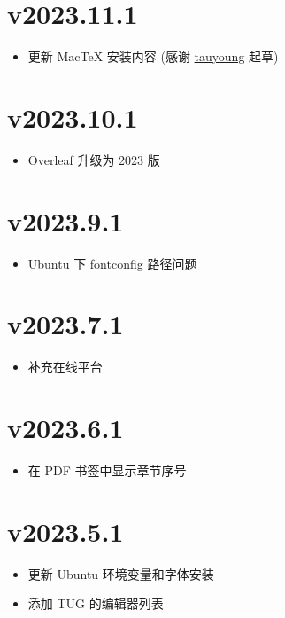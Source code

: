 \section*{v2023.11.1}

\begin{itemize}
  \item 更新 MacTeX 安装内容 (感谢 \href{https://github.com/tauyoungsama}{tauyoung} 起草)
\end{itemize}

\section*{v2023.10.1}

\begin{itemize}
  \item Overleaf 升级为 2023 版
\end{itemize}

\section*{v2023.9.1}

\begin{itemize}
  \item Ubuntu 下 fontconfig 路径问题
\end{itemize}

\section*{v2023.7.1}

\begin{itemize}
  \item 补充在线平台
\end{itemize}

\section*{v2023.6.1}

\begin{itemize}
  \item 在 PDF 书签中显示章节序号
\end{itemize}

\section*{v2023.5.1}

\begin{itemize}
  \item 更新 Ubuntu 环境变量和字体安装
  \item 添加 TUG 的编辑器列表
\end{itemize}

